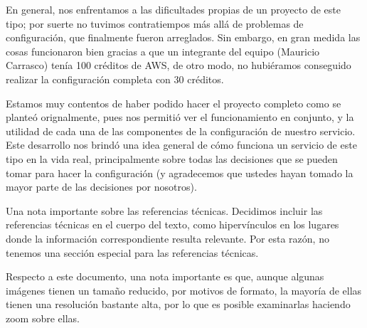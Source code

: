 \documentclass{article}
\begin{document}
En general, nos enfrentamos a las dificultades propias
de un proyecto de este tipo; por suerte no tuvimos
contratiempos m\'as all\'a de problemas de configuraci\'on,
que finalmente fueron arreglados.   Sin embargo, en gran
medida las cosas funcionaron bien gracias a que un
integrante del equipo (Mauricio Carrasco) ten\'ia 100
cr\'editos de AWS, de otro modo, no hubi\'eramos conseguido
realizar la configuraci\'on completa con 30 cr\'editos.

Estamos muy contentos de haber podido hacer el proyecto
completo como se plante\'o orignalmente, pues nos permiti\'o
ver el funcionamiento en conjunto, y la utilidad de cada
una de las componentes de la configuraci\'on de nuestro
servicio.   Este desarrollo nos brind\'o una idea general
de c\'omo funciona un servicio de este tipo en la vida
real, principalmente sobre todas las decisiones que se
pueden tomar para hacer la configuraci\'on (y agradecemos
que ustedes hayan tomado la mayor parte de las decisiones
por nosotros).

Una nota importante sobre las referencias t\'ecnicas.
Decidimos incluir las referencias t\'ecnicas en el cuerpo
del texto, como hiperv\'inculos en los lugares donde la
informaci\'on correspondiente resulta relevante.   Por
esta raz\'on, no tenemos una secci\'on especial para
las referencias t\'ecnicas.

Respecto a este documento, una nota importante es que,
aunque algunas im\'agenes tienen un tama\~no reducido,
por motivos de formato, la mayor\'ia de ellas tienen
una resoluci\'on bastante alta, por lo que es posible
examinarlas haciendo zoom sobre ellas.
\end{document}
